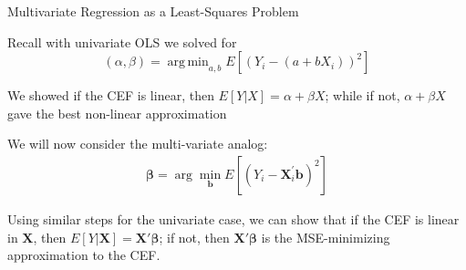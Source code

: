\documentclass[11pt,english,handout]{beamer}
\newenvironment{wideitemize}{\itemize\addtolength{\itemsep}{10pt}}{\enditemize}
\DeclareMathOperator*{\argmin}{arg\,min}
\begin{document}
\begin{frame}{Multivariate Regression as a Least-Squares Problem}
	\begin{wideitemize}
		\item
		Recall with univariate OLS we solved for 
		$$(\alpha, \beta) = \argmin_{a,b} E[ (Y_i - (a + b X_i))^2 ] $$
		
		We showed if the CEF is linear, then $E[Y|X] = \alpha + \beta X$; while if not, $\alpha + \beta X$ gave the best non-linear approximation
		
		\pause
		\item
		We will now consider the multi-variate analog:
		\begin{align*}
		\boldsymbol\beta= \arg \min_{\mathbf{b}} E\left[(Y_i-\mathbf{X}_i^\prime\boldsymbol b)^2\right]
		\end{align*}
	
		\item
		Using similar steps for the univariate case, we can show that if the CEF is linear in $\mathbf{X}$, then $E[Y| \mathbf{X}] = \mathbf{X}'\boldsymbol{\beta}$; if not, then $\mathbf{X}'\boldsymbol{\beta}$ is the MSE-minimizing approximation to the CEF.
	 
	\end{wideitemize}
\end{frame}
	
\end{document}
